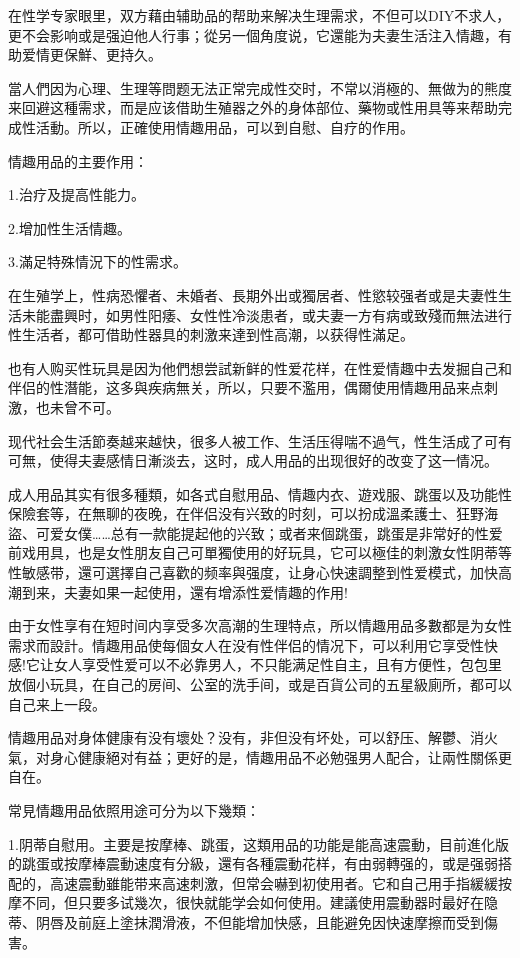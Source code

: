 \documentclass[12pt,UTF8]{ctexbook}
\begin{document}
在性学专家眼里，双方藉由辅助品的帮助来解决生理需求，不但可以DIY不求人，更不会影响或是强迫他人行事；從另一個角度说，它還能为夫妻生活注入情趣，有助爱情更保鮮、更持久。

當人們因为心理、生理等問题无法正常完成性交时，不常以消極的、無做为的熊度来回避这種需求，而是应该借助生殖器之外的身体部位、藥物或性用具等来帮助完成性活動。所以，正確使用情趣用品，可以到自慰、自疗的作用。

情趣用品的主要作用：

1.治疗及提高性能力。

2.增加性生活情趣。

3.滿足特殊情況下的性需求。

在生殖学上，性病恐懼者、未婚者、長期外出或獨居者、性慾较强者或是夫妻性生活未能盡興时，如男性阳痿、女性性冷淡患者，或夫妻一方有病或致殘而無法进行性生活者，都可借助性器具的刺激来達到性高潮，以获得性滿足。

也有人购买性玩具是因为他們想尝試新鲜的性爱花样，在性爱情趣中去发掘自己和伴侣的性潛能，这多與疾病無关，所以，只要不濫用，偶爾使用情趣用品来点刺激，也未曾不可。

现代社会生活節奏越来越快，很多人被工作、生活压得喘不過气，性生活成了可有可無，使得夫妻感情日漸淡去，这时，成人用品的出现很好的改变了这一情况。

成人用品其实有很多種類，如各式自慰用品、情趣内衣、遊戏服、跳蛋以及功能性保險套等，在無聊的夜晚，在伴侣没有兴致的时刻，可以扮成溫柔護士、狂野海盜、可爱女僕……总有一款能提起他的兴致；或者来個跳蛋，跳蛋是非常好的性爱前戏用具，也是女性朋友自己可單獨使用的好玩具，它可以極佳的刺激女性阴蒂等性敏感带，還可選擇自己喜歡的频率與强度，让身心快速調整到性爱模式，加快高潮到来，夫妻如果一起使用，還有增添性爱情趣的作用!

由于女性享有在短时间内享受多次高潮的生理特点，所以情趣用品多數都是为女性需求而設計。情趣用品使每個女人在没有性伴侣的情况下，可以利用它享受性快感!它让女人享受性爱可以不必靠男人，不只能满足性自主，且有方便性，包包里放個小玩具，在自己的房间、公室的洗手间，或是百貨公司的五星級廁所，都可以自己来上一段。

情趣用品对身体健康有没有壞处？没有，非但没有坏处，可以舒压、解鬱、消火氣，对身心健康絕对有益；更好的是，情趣用品不必勉强男人配合，让兩性關係更自在。

常見情趣用品依照用途可分为以下幾類：

1.阴蒂自慰用。主要是按摩棒、跳蛋，这類用品的功能是能高速震動，目前進化版的跳蛋或按摩棒震動速度有分級，還有各種震動花样，有由弱轉强的，或是强弱搭配的，高速震動雖能带来高速刺激，但常会嚇到初使用者。它和自己用手指緩緩按摩不同，但只要多试幾次，很快就能学会如何使用。建議使用震動器时最好在隐蒂、阴唇及前庭上塗抹潤滑液，不但能增加快感，且能避免因快速摩擦而受到傷害。
\end{document}
